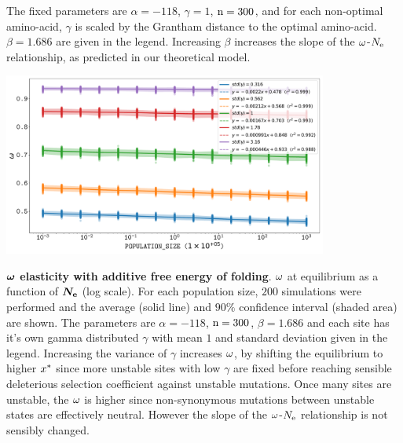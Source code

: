 \documentclass{article}
\begin{document}
The fixed parameters are $\alpha=-118$, $\gamma=1$, $\text{n}=300$, and for each non-optimal amino-acid, $\gamma$ is scaled by the Grantham distance to the optimal amino-acid. $\beta=1.686$ are given in the legend.
Increasing $\beta$ increases the slope of the $\omega$-$N_{\mathrm{e}}$ relationship, as predicted in our theoretical model.
\begin{center}
 \includegraphics[width=0.8\textwidth] {artworks/SimuStab-GammaStd-Elasticity.pdf}
\end{center}
\textbf{$\bm{\omega}$ elasticity with additive free energy of folding}.
$\omega$ at equilibrium as a function of $\bm{N_{\mathrm{e}}}$ (log scale).
For each population size, $200$ simulations were performed and the average (solid line) and $90\%$ confidence interval (shaded area) are shown.
The parameters are $\alpha=-118$, $\text{n}=300$, $\beta=1.686$ and each site has it's own gamma distributed $\gamma$ with mean $1$ and standard deviation given in the legend.
Increasing the variance of $\gamma$ increases $\omega$, by shifting the equilibrium to higher $x^{*}$ since more unstable sites with low $\gamma$ are fixed before reaching sensible deleterious selection coefficient against unstable mutations. Once many sites are unstable, the $\omega$ is higher since non-synonymous mutations between unstable states are effectively neutral. However the slope of the $\omega$-$N_{\mathrm{e}}$ relationship is not sensibly changed.
\end{document}
